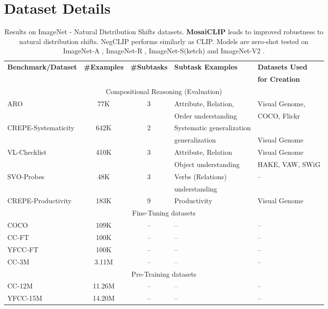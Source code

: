 \documentclass[11pt]{article}
\newcommand{\methodcompbold}{\textbf{MosaiCLIP}}
\newcommand{\clip}{CLIP}
\newcommand{\negclip}{NegCLIP}
\begin{document}
\begin{table}[h!]
\begin{table*}[h!]
  \caption{Results on {\color{blue} ImageNet - Natural Distribution Shifts datasets}. \methodcompbold{} leads to improved robustness to natural distribution shifts. \negclip{} performs similarly as \clip{}. Models are zero-shot tested on ImageNet-A \citep{Hendrycks_2021_CVPR}, ImageNet-R \citep{hendrycks2021many}, ImageNet-S(ketch) \citep{wang2019learning} and ImageNet-V2 \citep{recht2019imagenet}.}
  \label{tab:rob_nat_shifts}
\end{table*}


\section{Dataset Details}
\label{data_details}
\begin{table*}[h!]
  \centering
  \begin{tabular}{lcc@{\hspace{0.75em}}ll}
    \toprule
    \textbf{Benchmark/Dataset} & \textbf{\#Examples} & \textbf{\#Subtasks} & \textbf{Subtask Examples} & \textbf{Datasets Used}\\
    & & & & \textbf{for Creation}\\
    \midrule
    \multicolumn{5}{c}{Compositional Reasoning (Evaluation)}\\
    \midrule
    \rowcolor{gray!12}
    ARO & 77K & 3 & Attribute, Relation, & Visual Genome,\\
    \rowcolor{gray!12}
    & & & Order understanding & COCO, Flickr \\
    CREPE-Systematicity & 642K & 2 & Systematic generalization & \\
    & & & generalization & Visual Genome\\
    \rowcolor{gray!12}
    VL-Checklist & 410K & 3 & Attribute, Relation & Visual Genome\\
    \rowcolor{gray!12}
    & & & Object understanding & HAKE, VAW, SWiG\\
    SVO-Probes & 48K & 3 & Verbs (Relations) & --\\
    & & & understanding & \\
    \rowcolor{gray!12}
    CREPE-Productivity & 183K & 9 & Productivity & Visual Genome\\
    \midrule
    \multicolumn{5}{c}{Fine-Tuning datasets} \\
    \midrule
    \rowcolor{gray!12}
    COCO & 109K & -- & -- & --\\
    CC-FT & 100K & -- & -- & --\\
    \rowcolor{gray!12}
    YFCC-FT & 100K & -- & -- & --\\
    CC-3M & 3.11M & -- & -- & --\\
    \midrule
    \multicolumn{5}{c}{Pre-Training datasets} \\
    \midrule
    \rowcolor{gray!12}
    CC-12M & 11.26M & -- & -- & --\\
    YFCC-15M & 14.20M & -- & -- & --\\
    \bottomrule
  \end{tabular}


\end{table*}
\end{table}
\end{document}
